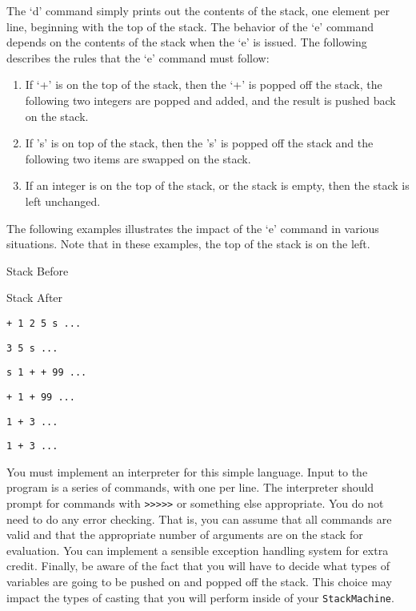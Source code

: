 The `d' command simply prints out the contents of the stack, one element
per line, beginning with the top of the stack. The behavior of the `e'
command depends on the contents of the stack when the `e' is issued. The
following describes the rules that the `e' command must follow:

\begin{enumerate}
\item
  If `+' is on the top of the stack, then the `+' is popped off the
  stack, the following two integers are popped and added, and the result
  is pushed back on the stack.
\item
  If 's' is on top of the stack, then the 's' is popped off the stack
  and the following two items are swapped on the stack.
\item
  If an integer is on the top of the stack, or the stack is empty, then
  the stack is left unchanged.
\end{enumerate}

The following examples illustrates the impact of the `e' command in
various situations. Note that in these examples, the top of the stack is
on the left.

Stack Before

Stack After

\begin{verbatim}
+ 1 2 5 s ...
\end{verbatim}

\begin{verbatim}
3 5 s ...
\end{verbatim}

\begin{verbatim}
s 1 + + 99 ...
\end{verbatim}

\begin{verbatim}
+ 1 + 99 ...
\end{verbatim}

\begin{verbatim}
1 + 3 ...
\end{verbatim}

\begin{verbatim}
1 + 3 ...
\end{verbatim}

You must implement an interpreter for this simple language. Input to the
program is a series of commands, with one per line. The interpreter
should prompt for commands with
\texttt{\textgreater{}\textgreater{}\textgreater{}\textgreater{}\textgreater{}}
or something else appropriate. You do not need to do any error checking.
That is, you can assume that all commands are valid and that the
appropriate number of arguments are on the stack for evaluation. You can
implement a sensible exception handling system for extra credit.
Finally, be aware of the fact that you will have to decide what types of
variables are going to be pushed on and popped off the stack. This
choice may impact the types of casting that you will perform inside of
your \texttt{StackMachine}.

